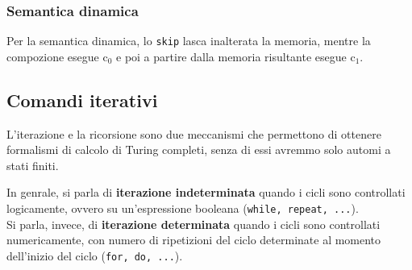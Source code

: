
\subsubsection{Semantica dinamica}
Per la semantica dinamica, lo \texttt{skip} lasca inalterata la memoria, mentre la compozione esegue $\mathrm{c}_0$ e poi a partire dalla memoria risultante esegue $\mathrm{c}_1$.




\subsection{Comandi iterativi}
L'iterazione e la ricorsione sono due meccanismi che permettono di ottenere formalismi di calcolo di Turing completi, senza di essi avremmo solo automi a stati finiti.

\smallskip
In genrale, si parla di \textbf{iterazione indeterminata} quando i cicli sono controllati logicamente, ovvero su un'espressione booleana (\texttt{while, repeat, ...}).\\[0.2ex]
Si parla, invece, di \textbf{iterazione determinata} quando i cicli sono controllati numericamente, con numero di ripetizioni del ciclo determinate al momento dell'inizio del ciclo (\texttt{for, do, ...}).

